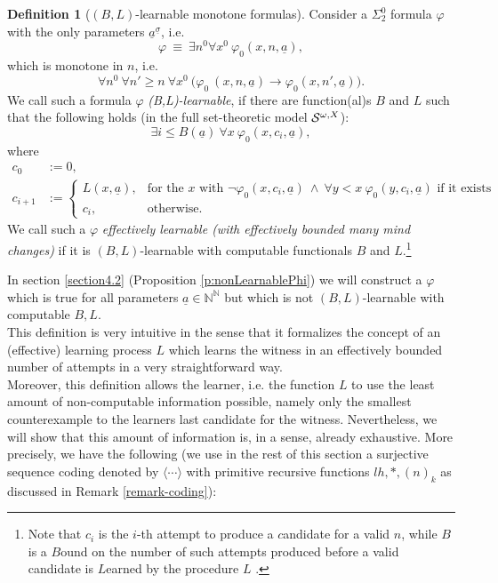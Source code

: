 \documentclass[1p]{elsarticle}
\newcommand{\NN}{\ensuremath{\mathbb{N}}}
\newcommand{\tup}{\underline} %
\newcommand{\Telse}{\text{otherwise}}
\theoremstyle{plain}
\theoremstyle{definition}
\newtheorem{dfn}[thm]{Definition}
\theoremstyle{remark}
\renewcommand{\phi}{\varphi}
\theoremstyle{definition}
\begin{document}
\begin{dfn}[$(B,L)$-learnable monotone formulas]\label{d:fmcMon}
Consider a $\Sigma^0_2$ formula $\phi$ with the only parameters $\tup a^{\tup \sigma}$, i.e.
\[\phi\ \equiv\ \exists n^0 \forall x^0\ \phi_0(x,n,\tup a),\]
which is monotone in $n$, i.e.
\[ 
\forall n^0\ \forall n'\ge n\ \forall x^0\ \big(  \phi_0\ (x,n,\tup a) \rightarrow  \phi_0(x,n',\tup a) \big).
\]
We call such a formula $\phi$ 
{\em (B,L)-learnable},
if there are function(al)s $B$ and $L$ such that the following holds 
(in the full set-theoretic model ${\cal S}^{\omega,X}$):
\[ 
\exists i\leq B(\tup a)\ \forall x\ \phi_0(x,c_i,\tup a),\] where
\begin{align*}
c_0&:=0,\\
c_{i+1}&:=
\begin{cases}
L(x, \tup a),&\text{for the $x$ with } \neg\phi_0(x,c_i,\tup a)\ \wedge\ \forall y<x\ \phi_0(y,c_i,\tup a) \text{ if it exists}\\
c_i,&\Telse.
\end{cases}
\end{align*}
We call such a $\phi$ 
{\em effectively learnable (with effectively bounded many mind changes)} 
if it is $(B,L)$-learnable with computable functionals $B$ and $L$.\footnote{Note that $c_i$ is the $i$-th attempt to produce a $c$andidate for a valid $n$, while $B$ is a $B$ound on the number of such attempts produced before a valid candidate is $L$earned by the procedure $L$ .}
\end{dfn}
In section \ref{section4.2} (Proposition \ref{p:nonLearnablePhi}) 
we will construct a $\varphi$ which is true 
for all parameters $\underline{a}\in\NN^{\NN}$ 
but which is not $(B,L)$-learnable with 
computable $B,L.$ 
\\[1mm] 
This definition is very intuitive in the sense that it formalizes the concept of an (effective) learning process $L$ which learns the witness in an effectively bounded number of attempts in a very straightforward way.\\
Moreover, this definition allows the learner, i.e. the function $L$ to use the least amount of non-computable information possible, namely only the smallest counterexample to the learners last candidate for the witness. 
Nevertheless, we will show that this amount of information is, in a sense, 
already exhaustive. More precisely, we have the following (we use in the 
rest of this section a surjective sequence coding 
denoted by $\langle\cdots\rangle$ with primitive recursive functions 
$lh,*,(n)_k$ as discussed in Remark \ref{remark-coding}):
\end{document}
